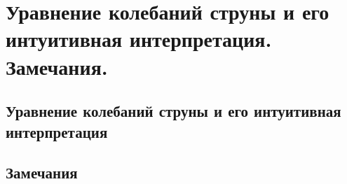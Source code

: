 \chapter{Уравнение колебаний струны и его интуитивная интерпретация.
Замечания.}

\section{Уравнение колебаний струны и его интуитивная интерпретация}
\section{Замечания}
\newpage
